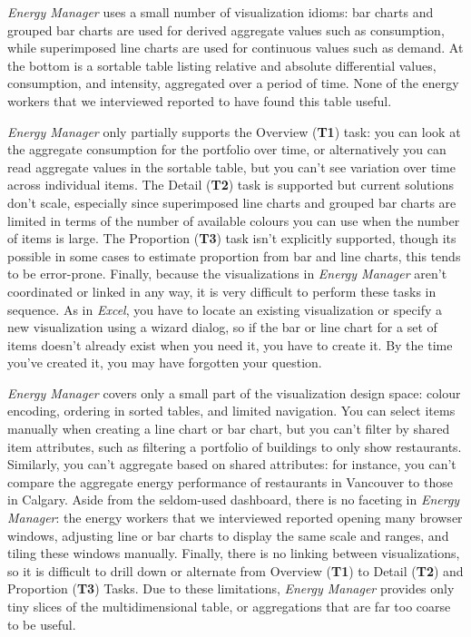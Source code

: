 \documentclass[journal]{vgtc}                %
\newcommand{\bstart}[1]{\vspace{1mm} \noindent{\textbf{#1:}}}
\begin{document}
\bstart{Analysis} {\it Energy Manager} uses a small number of visualization idioms: bar charts and grouped bar charts are used for derived aggregate values such as consumption, while superimposed line charts are used for continuous values such as demand. 
At the bottom is a sortable table listing relative and absolute differential values, consumption, and intensity, aggregated over a period of time. 
None of the energy workers that we interviewed reported to have found this table useful.

{\it Energy Manager} only partially supports the Overview ({\bf T1}) task: you can look at the aggregate consumption for the portfolio over time, or alternatively you can read aggregate values in the sortable table, but you can't see variation over time across individual items. 
The Detail ({\bf T2}) task is supported but current solutions don't scale, especially since superimposed line charts and grouped bar charts are limited in terms of the number of available colours you can use when the number of items is large. 
The Proportion ({\bf T3}) task isn't explicitly supported, though its possible in some cases to estimate proportion from bar and line charts, this tends to be error-prone.
Finally, because the visualizations in {\it Energy Manager} aren't coordinated or linked in any way, it is very difficult to perform these tasks in sequence. 
As in {\it Excel}, you have to locate an existing visualization or specify a new visualization using a wizard dialog, so if the bar or line chart for a set of items doesn't already exist when you need it, you have to create it. By the time you've created it, you may have forgotten your question.

{\it Energy Manager} covers only a small part of the visualization design space: colour encoding, ordering in sorted tables, and limited navigation.
You can select items manually when creating a line chart or bar chart, but you can't filter by shared item attributes, such as filtering a portfolio of buildings to only show restaurants.
Similarly, you can't aggregate based on shared attributes: for instance, you can't compare the aggregate energy performance of restaurants in Vancouver to those in Calgary.
Aside from the seldom-used dashboard, there is no faceting in {\it Energy Manager}: the energy workers that we interviewed reported opening many browser windows, adjusting line or bar charts to display the same scale and ranges, and tiling these windows manually.
Finally, there is no linking between visualizations, so it is difficult to drill down or alternate from Overview ({\bf T1}) to Detail ({\bf T2}) and Proportion ({\bf T3}) Tasks.
Due to these limitations, {\it Energy Manager} provides only tiny slices of the multidimensional table, or aggregations that are far too coarse to be useful. 
\end{document}
